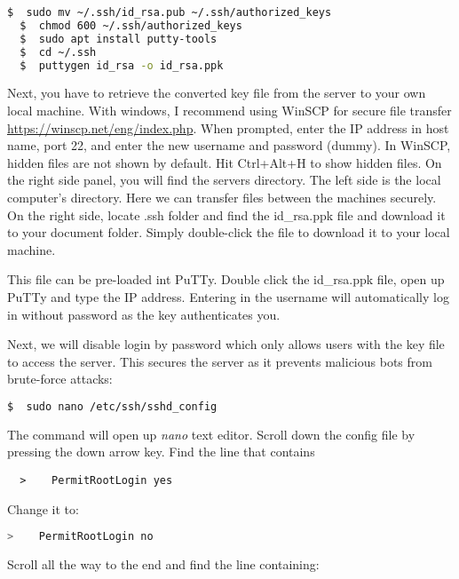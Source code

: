 \begin{lstlisting}[language=bash]
  $  sudo mv ~/.ssh/id_rsa.pub ~/.ssh/authorized_keys
  $  chmod 600 ~/.ssh/authorized_keys
  $  sudo apt install putty-tools
  $  cd ~/.ssh
  $  puttygen id_rsa -o id_rsa.ppk

\end{lstlisting}

\noindent
Next, you have to retrieve the converted key file from the server to your own local machine. With windows, I recommend using WinSCP for secure file transfer \url{https://winscp.net/eng/index.php}. When prompted, enter the IP address in host name, port 22, and enter the new username and password (dummy). In WinSCP, hidden files are not shown by default. Hit Ctrl+Alt+H to show hidden files. On the right side panel, you will find the servers directory. The left side is the local computer's directory. Here we can transfer files between the machines securely. On the right side, locate .ssh folder and find the id\_rsa.ppk file and download it to your document folder. Simply double-click the file to download it to your local machine.

\noindent
This file can be pre-loaded int PuTTy. Double click the id\_rsa.ppk file, open up PuTTy and type the IP address. Entering in the username will automatically log in without password as the key authenticates you.

\noindent
Next, we will disable login by password which only allows users with the key file to access the server. This secures the server as it prevents malicious bots from brute-force attacks:

\begin{lstlisting}[language=bash]
  $  sudo nano /etc/ssh/sshd_config
\end{lstlisting}

\noindent
The command will open up \emph{nano} text editor. Scroll down the config file by pressing the down arrow key. Find the line that contains

\begin{lstlisting}
  >    PermitRootLogin yes
\end{lstlisting}

\noindent
Change it to:

\begin{lstlisting}[language=bash]
  >    PermitRootLogin no
\end{lstlisting}

\noindent
Scroll all the way to the end and find the line containing:

